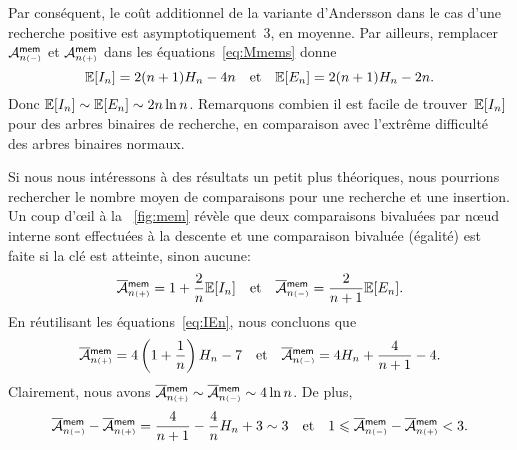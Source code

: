 Par conséquent, le coût additionnel de la variante d'Andersson dans le
cas d'une recherche positive est asymptotiquement~\(3\), en
moyenne. Par ailleurs, remplacer \(\M{\fun{mem}}{n{\scriptscriptstyle
    (-)}}\) et \(\M{\fun{mem}}{n{\scriptscriptstyle (+)}}\) dans les
équations~\eqref{eq:Mmems} donne
\begin{equation}
\Expected{I_n} = 2(n+1)H_n - 4n
\quad\text{et}\quad
\Expected{E_n} = 2(n+1)H_n - 2n.
\label{eq:IEn}
\end{equation}
Donc \(\Expected{I_n} \sim \Expected{E_n} \sim 2n\ln n\). Remarquons
combien il est facile de trouver~\(\Expected{I_n}\) pour des arbres
binaires de recherche, en comparaison avec l'extrême difficulté des
arbres binaires normaux.

Si nous nous intéressons à des résultats un petit plus théoriques,
nous pourrions rechercher le nombre moyen de comparaisons pour une
recherche et une insertion. Un coup d'œil à la \fig~\vref{fig:mem}
révèle que deux comparaisons bivaluées par nœud interne sont
effectuées à la descente et une comparaison bivaluée (égalité) est
faite si la clé est atteinte, sinon aucune:
\begin{equation}
\OM{\fun{mem}}{n{\scriptscriptstyle(+)}}
  = 1 + \frac{2}{n}\Expected{I_n}
\quad\text{et}\quad
\OM{\fun{mem}}{n{\scriptscriptstyle(-)}}
  = \frac{2}{n+1}\Expected{E_n}.
\label{eq:Mmem_cmp1}
\end{equation}
En réutilisant les équations~\eqref{eq:IEn}, nous concluons que
\begin{equation}
\OM{\fun{mem}}{n{\scriptscriptstyle(+)}}
  = 4\left(1+\frac{1}{n}\right)H_n - 7
\quad\text{et}\quad
\OM{\fun{mem}}{n{\scriptscriptstyle(-)}}
  = 4H_n + \frac{4}{n+1} - 4.
\index{mem@$\OM{\fun{mem}}{n{\scriptscriptstyle(-)}}$}
\index{mem@$\OM{\fun{mem}}{n{\scriptscriptstyle(+)}}$}
\label{eq:Mmem_cmp2}
\end{equation}
Clairement, nous avons \(\OM{\fun{mem}}{n{\scriptscriptstyle(+)}} \sim
\OM{\fun{mem}}{n{\scriptscriptstyle(-)}} \sim 4\ln n\). De plus,
\begin{equation*}
\OM{\fun{mem}}{n{\scriptscriptstyle (-)}} -
\OM{\fun{mem}}{n{\scriptscriptstyle (+)}} =
\frac{4}{n+1} - \frac{4}{n}H_n + 3 \sim 3
\quad\text{et}\quad
1 \leqslant \OM{\fun{mem}}{n{\scriptscriptstyle (-)}} -
\OM{\fun{mem}}{n{\scriptscriptstyle (+)}} < 3.
\end{equation*}

